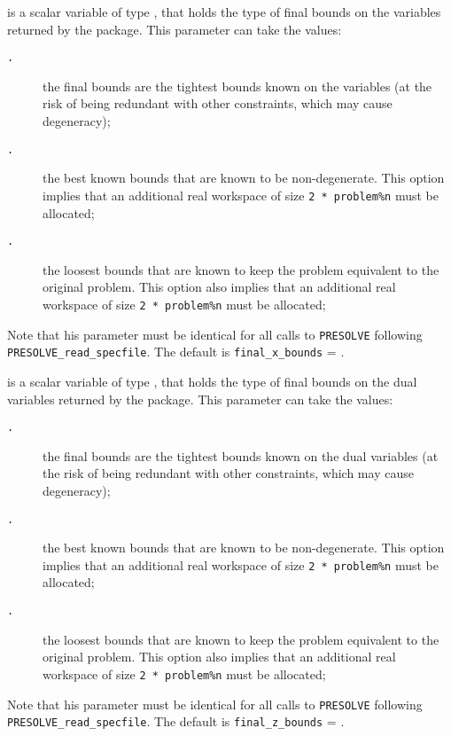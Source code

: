 \documentclass{galahad}
\newcommand{\packagename}{PRESOLVE}
\newcommand{\sym}{\tt\small}
\begin{document}
\begin{description}
 is a scalar variable of type \integer, that
holds the type of final bounds on the variables returned by the
package.  This parameter can take the values:
\begin{description}
\item[\sym \galsymtightest.] the final bounds are the tightest bounds
                known on the variables (at the risk of
                being redundant with other constraints,
                which may cause degeneracy);
\item[\sym \galsymnondegenerate.] the best known bounds that are known to
                      be non-degenerate. This option implies
                      that an additional real workspace of size
                      {\tt 2 * problem\%n} must be allocated;
\item[\sym \galsymloosest.] the loosest bounds that are known to
               keep the problem equivalent to the
               original problem. This option also
               implies that an additional real workspace of size
               {\tt 2 * problem\%n} must be allocated;
\end{description}
Note that his parameter must be identical for all calls to
{\tt \packagename} following {\tt \packagename\_read\_specfile}.
The default is {\tt final\_x\_bounds} = {\sym \galsymtightest}.

 is a scalar variable of type \integer, that
holds the type of final bounds on the dual variables returned by
the package.  This parameter can take the values:
\begin{description}
\item[\sym \galsymtightest.] the final bounds are the tightest bounds
                known on the dual variables (at the risk of
                being redundant with other constraints,
                which may cause degeneracy);
\item[\sym \galsymnondegenerate.] the best known bounds that are known to
                      be non-degenerate. This option implies
                      that an additional real workspace of size
                      {\tt 2 * problem\%n} must be allocated;
\item[\sym \galsymloosest.] the loosest bounds that are known to
               keep the problem equivalent to the
               original problem. This option also
               implies that an additional real workspace of size
               {\tt 2 * problem\%n} must be allocated;
\end{description}
Note that his parameter must be identical for all calls to
{\tt \packagename} following {\tt \packagename\_read\_specfile}.
The default is {\tt final\_z\_bounds} = {\sym \galsymtightest}.


\end{description}
\end{document}
